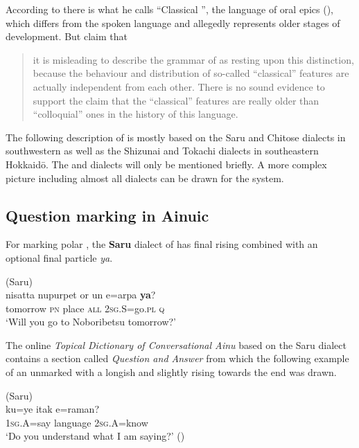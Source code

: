 According to \citet[4]{Shibatani1990} there is what he calls “Classical ”, the language of oral epics (\textit{}), which differs from the spoken language and allegedly represents older stages of development. But \citet[378]{NakagawaOkuda2007} claim that

\begin{quote}
it is misleading to describe the grammar of  as resting upon this distinction, because the behaviour and distribution of so-called “classical” features are actually independent from each other. There is no sound evidence to support the claim that the “classical” features are really older than “colloquial” ones in the history of this language.
\end{quote}

The following description of  is mostly based on the Saru and Chitose dialects in southwestern  as well as the Shizunai and Tokachi dialects in southeastern Hokkaid\=o. The  and  dialects will only be mentioned briefly. A more complex picture including almost all dialects can be drawn for the  system.

\subsection{Question marking in Ainuic}\label{sec:5.1.2}

For marking polar , the \textbf{Saru} dialect of  has final rising  combined with an optional final particle \textit{ya}.

\ea%
    \label{ex:ainu:2}
     (Saru)\\
    \gll nisatta   nupurpet  or  un  e=arpa \textbf{{ya}}?\\
    tomorrow   \textsc{pn}    place  \textsc{all}  2\textsc{sg}.S=go.\textsc{pl}  \textsc{q}\\
    \glt ‘Will you go to Noboribetsu tomorrow?’ \citep[497]{Bugaeva2012}
    \z

\noindent The online \textit{Topical Dictionary of Conversational Ainu} based on the Saru dialect contains a section called \textit{Question and Answer} from which the following example of an unmarked  with a longish and slightly rising  towards the end was drawn.

\ea%
    \label{ex:ainu:3}
     (Saru)\\
    \gll ku=ye    itak    e=raman?\\
    1\textsc{sg}.A=say  language  2\textsc{sg}.A=know\\
    \glt ‘Do you understand what I am saying?’ (\citealt{NINJAL2015})
    \z

